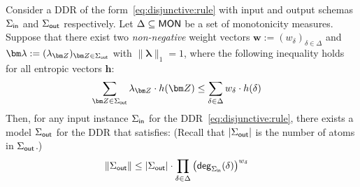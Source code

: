 \documentclass{theoretics}
\newcommand{\norm}[1]{\|#1\|}
\newcommand{\degree}{\text{\sf deg}}
\newcommand{\inn}{\text{\sf in}}
\newcommand{\out}{\text{\sf out}}
\newcommand{\mon}{\text{\sf MON}}
\begin{document}
\begin{theorem} \label{th:upper:bound}
Consider a DDR of the form~\eqref{eq:disjunctive:rule}
with input and output schemas $\Sigma_{\inn}$ and $\Sigma_{\out}$ respectively. Let
$\Delta\subseteq \mon$ be a set of monotonicity measures.
Suppose that there exist two {\em non-negative} weight vectors $\bm w := (w_\delta)_{\delta \in \Delta}$ and
$\bm \lambda := (\lambda_{\bm Z})_{\bm Z \in\Sigma_{\out}}$
with $\norm{\bm \lambda}_1=1$,
where the following inequality holds for all entropic vectors $\bm h$:
%
\begin{align}
    \sum_{\bm Z \in \Sigma_{\out}}\lambda_{\bm Z}\cdot h(\bm Z)
    & \leq \sum_{\delta \in \Delta} w_\delta \cdot h(\delta)\label{eqn:ddr:shearer}
\end{align}
  Then, for any input instance $\Sigma_{\inn}$ for the DDR~\eqref{eq:disjunctive:rule},
  there exists a model $\Sigma_{\out}$ for the DDR that satisfies: (Recall that $|\Sigma_\out|$ is the number of atoms in $\Sigma_\out$.)
  \begin{align}
    \norm{\Sigma_{\out}} &\leq
        |\Sigma_\out|\cdot
      \prod_{\delta \in \Delta} \left(\degree_{\Sigma_{\inn}}(\delta)\right)^{w_\delta}
      \label{eq:q:inequality}
  \end{align}
\end{theorem}
\end{document}
